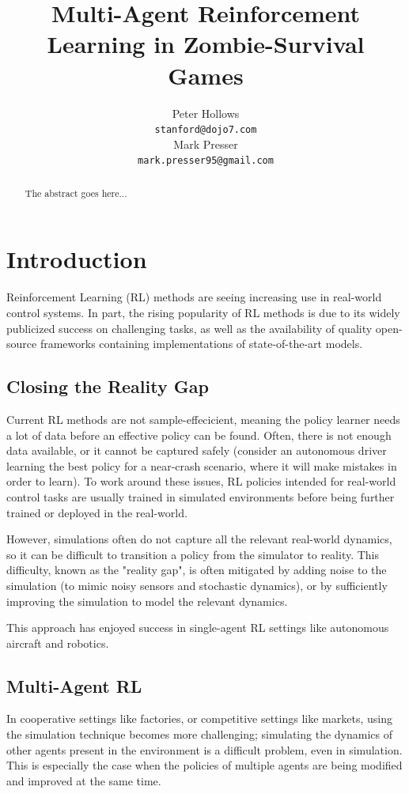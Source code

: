 \documentclass[11pt,a4paper]{article}
\title{Multi-Agent Reinforcement Learning in Zombie-Survival Games}
\author{Peter Hollows \\
  \texttt{stanford@dojo7.com} \\\And
  Mark Presser \\
  \texttt{mark.presser95@gmail.com} \\}
\date{}
\begin{document}
\maketitle
\begin{abstract}
  The abstract goes here...
\end{abstract}

\section{Introduction}

Reinforcement Learning (RL) methods are seeing increasing use in real-world control systems.
In part, the rising popularity of RL methods is due to its widely publicized success on challenging tasks,
as well as the availability of quality open-source frameworks containing implementations of state-of-the-art models.

\subsection{Closing the Reality Gap}

Current RL methods are not sample-effecicient, meaning the policy learner needs a lot of data before an effective policy can be found.
Often, there is not enough data available, or it cannot be captured safely (consider an autonomous driver learning the best policy for a near-crash scenario, where it will make mistakes in order to learn).
To work around these issues, RL policies intended for real-world control tasks are usually trained in simulated environments before being further trained or deployed in the real-world.

However, simulations often do not capture all the relevant real-world dynamics, so it can be difficult to transition a policy from the simulator to reality.
This difficulty, known as the "reality gap", is often mitigated by adding noise to the simulation (to mimic noisy sensors and stochastic dynamics),
or by sufficiently improving the simulation to model the relevant dynamics.

This approach has enjoyed success in single-agent RL settings like autonomous aircraft and robotics.

\subsection{Multi-Agent RL}

In cooperative settings like factories, or competitive settings like markets, using the simulation technique becomes more challenging;
simulating the dynamics of other agents present in the environment is a difficult problem, even in simulation.
This is especially the case when the policies of multiple agents are being modified and improved at the same time.
\end{document}
